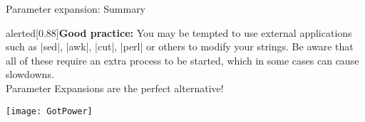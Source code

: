 \begin{frame}{Parameter expansion: Summary}
    \vspace{-3mm}
    \begin{varblock}{alerted}[0.88\textwidth]{\textbf{Good practice:}}
        You may be tempted to use external applications such as \bash|sed|, \bash|awk|, \bash|cut|, \bash|perl| or others to modify your strings.
        Be aware that all of these require an extra process to be started, which in some cases can cause slowdowns.\\
        \alert{Parameter Expansions are the perfect alternative!}
    \end{varblock}
    \bigskip
    \centerline{\texttt{[image: GotPower]}}
\end{frame}
